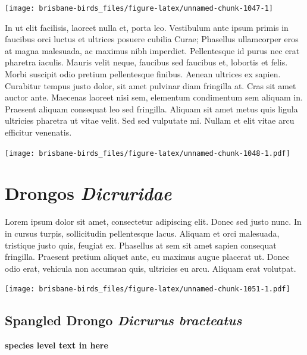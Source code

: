 \documentclass[]{book}
\let\origfigure\figure
\let\endorigfigure\endfigure
\renewenvironment{figure}[1][2] {
  \expandafter\origfigure\expandafter[H]
} {
  \endorigfigure
}
\begin{document}
\begin{figure}
\texttt{[image: brisbane-birds\_files/figure-latex/unnamed-chunk-1047-1]} \caption{insert figure caption}\label{fig:unnamed-chunk-1047}
\end{figure}

In ut elit facilisis, laoreet nulla et, porta leo. Vestibulum ante ipsum
primis in faucibus orci luctus et ultrices posuere cubilia Curae;
Phasellus ullamcorper eros at magna malesuada, ac maximus nibh
imperdiet. Pellentesque id purus nec erat pharetra iaculis. Mauris velit
neque, faucibus sed faucibus et, lobortis et felis. Morbi suscipit odio
pretium pellentesque finibus. Aenean ultrices ex sapien. Curabitur
tempus justo dolor, sit amet pulvinar diam fringilla at. Cras sit amet
auctor ante. Maecenas laoreet nisi sem, elementum condimentum sem
aliquam in. Praesent aliquam consequat leo sed fringilla. Aliquam sit
amet metus quis ligula ultricies pharetra ut vitae velit. Sed sed
vulputate mi. Nullam et elit vitae arcu efficitur venenatis.

\begin{figure}
\centering
\texttt{[image: brisbane-birds\_files/figure-latex/unnamed-chunk-1048-1.pdf]}
\caption{\label{fig:unnamed-chunk-1048}insert figure caption}
\end{figure}

\chapter{\texorpdfstring{Drongos
\emph{Dicruridae}}{Drongos Dicruridae}}\label{drongos-dicruridae}

Lorem ipsum dolor sit amet, consectetur adipiscing elit. Donec sed justo
nunc. In in cursus turpis, sollicitudin pellentesque lacus. Aliquam et
orci malesuada, tristique justo quis, feugiat ex. Phasellus at sem sit
amet sapien consequat fringilla. Praesent pretium aliquet ante, eu
maximus augue placerat ut. Donec odio erat, vehicula non accumsan quis,
ultricies eu arcu. Aliquam erat volutpat.

\texttt{[image: brisbane-birds\_files/figure-latex/unnamed-chunk-1051-1.pdf]}

\section{\texorpdfstring{Spangled Drongo \emph{Dicrurus
bracteatus}}{Spangled Drongo Dicrurus bracteatus}}\label{spangled-drongo-dicrurus-bracteatus}

\textbf{species level text in here}
\end{document}
